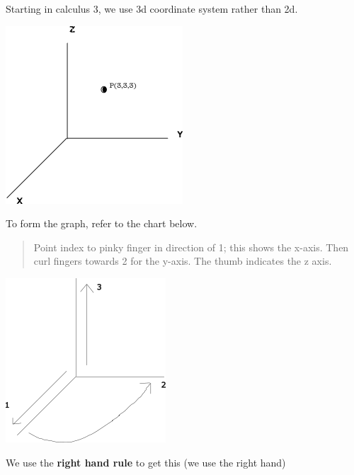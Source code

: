 \documentclass[12pt]{article}
\begin{document}
Starting in calculus 3, we use 3d coordinate system rather than 2d.

\includegraphics{3dgraph.png}

To form the graph, refer to the chart below.
\begin{quote}
	Point index to pinky finger in direction of 1; this shows the x-axis.
Then curl fingers towards 2 for the y-axis. The thumb indicates the z axis.	
\end{quote}

\includegraphics{howtomakegraph}

We use the \textbf{right hand rule} to get this (we use the right hand)
\end{document}
